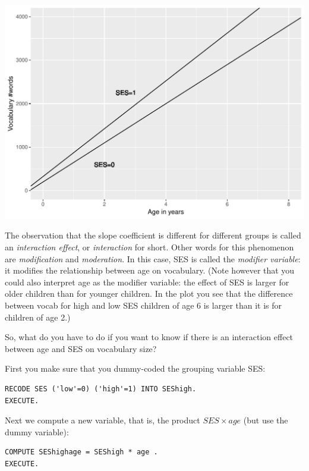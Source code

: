 \documentclass[]{report}\usepackage[]{graphicx}\usepackage[]{color}
\makeatletter
\def\maxwidth{ %
  \ifdim\Gin@nat@width>\linewidth
    \linewidth
  \else
    \Gin@nat@width
  \fi
}
\newenvironment{knitrout}{}{} %
\makeatother
\begin{document}
\begin{knitrout}
\color{fgcolor}
\includegraphics[width=\maxwidth]{figure/summary_plot-1} 

\end{knitrout}


The observation that the slope coefficient is different for different groups is called an \textit{interaction effect}, or \textit{interaction} for short. Other words for this phenomenon are \textit{modification} and \textit{moderation}. In this case, SES is called the \textit{modifier variable}: it modifies the relationship between age on vocabulary. (Note however that you could also interpret age as the modifier variable: the effect of SES is larger for older children than for younger children. In the plot you see that the difference between vocab for high and low SES children of age 6 is larger than it is for children of age 2.)

So, what do you have to do if you want to know if there is an interaction effect between age and SES on vocabulary size? 

First you make sure that you dummy-coded the grouping variable SES: 


\begin{verbatim}
RECODE SES ('low'=0) ('high'=1) INTO SEShigh.
EXECUTE.
\end{verbatim}

Next we compute a new variable, that is, the product $SES \times age$ (but use the dummy variable):


\begin{verbatim}
COMPUTE SEShighage = SEShigh * age .
EXECUTE.
\end{verbatim}
\end{document}
